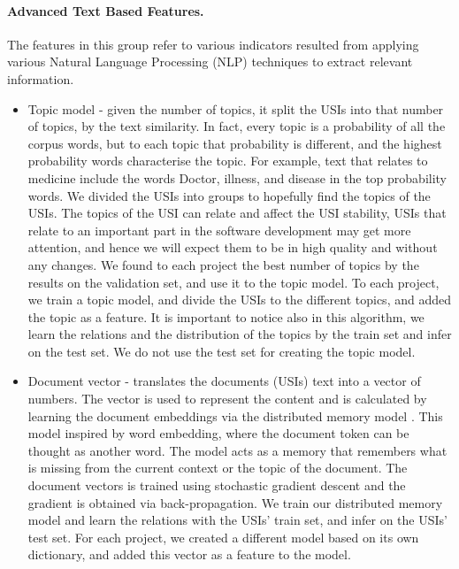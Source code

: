 \paragraph{\textbf{Advanced Text Based Features.}}
The features in this group refer to various indicators resulted from applying various Natural Language Processing (NLP) techniques to extract relevant information. 

    \begin{itemize}
        \item Topic model - %
        given the number of topics, it split the USIs into that number of topics, by the text similarity. In fact, every topic is a probability of all the corpus words, but to each topic that probability is different, and the highest probability words characterise the topic. For example, text that relates to medicine include the words Doctor, illness, and disease in the top probability words. We divided the USIs into groups to hopefully find the topics of the USIs. The topics of the USI can relate and affect the USI stability, USIs that relate to an important part in the software development may get more attention, and hence we will expect them to be in high quality and without any changes. We found to each project the best number of topics by the results on the validation set, and use it to the topic model. To each project, we train a topic model, and divide the USIs to the different topics, and added the topic as a feature. It is important to notice also in this algorithm, we learn the relations and the distribution of the topics by the train set and infer on the test set. We do not use the test set for creating the topic model.
         \item Document vector - translates the documents (USIs) text into a vector of numbers. The vector is used to represent the content and is calculated by learning the document embeddings via the distributed memory model  \cite{le2014distributed}. This model inspired by word embedding, where the document token can be thought as another word. The model acts as a memory that remembers what is missing from the current context or the topic of the document. The document vectors is trained using stochastic gradient descent and the gradient is obtained via back-propagation. We train our distributed memory model and learn the relations with the USIs' train set, and infer on the USIs' test set. For each project, we created a different model based on its own dictionary, and added this vector as a feature to the model.
           \end{itemize}
